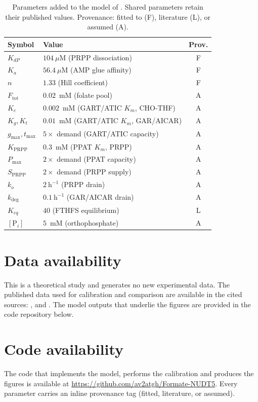 \documentclass[a4paper,fleqn]{cas-sc}
\begin{document}
\begin{table}[t]
\centering
\caption{Parameters added to the model of \citet{oizel2020}. Shared parameters
retain their published values. Provenance: fitted to \citet{witus2026} (F),
literature (L), or assumed (A).}
\label{tab:par}
\begin{tabular}{llc}
\toprule
Symbol & Value & Prov. \\
\midrule
$K_{dP}$ & $104~\mu$M (PRPP dissociation) & F \\
$K_a$ & $56.4~\mu$M (AMP glue affinity) & F \\
$n$ & $1.33$ (Hill coefficient) & F \\
$F_{\mathrm{tot}}$ & $0.02$~mM (folate pool) & A \\
$K_c$ & $0.002$~mM (GART/ATIC $K_m$, CHO-THF) & A \\
$K_g,K_t$ & $0.01$~mM (GART/ATIC $K_m$, GAR/AICAR) & A \\
$g_{\max},t_{\max}$ & $5\times$ demand (GART/ATIC capacity) & A \\
$K_{\mathrm{PRPP}}$ & $0.3$~mM (PPAT $K_m$, PRPP) & A \\
$P_{\max}$ & $2\times$ demand (PPAT capacity) & A \\
$S_{\mathrm{PRPP}}$ & $2\times$ demand (PRPP supply) & A \\
$k_o$ & $2~\mathrm{h}^{-1}$ (PRPP drain) & A \\
$k_{\mathrm{deg}}$ & $0.1~\mathrm{h}^{-1}$ (GAR/AICAR drain) & A \\
$K_{eq}$ & $40$ (FTHFS equilibrium) & L \\
$[\mathrm{P}_i]$ & $5$~mM (orthophosphate) & A \\
\bottomrule
\end{tabular}
\end{table}

\section*{Data availability}
This is a theoretical study and generates no new experimental data. The published
data used for calibration and comparison are available in the cited sources:
\citet{witus2026}, \citet{strefeler2025} and \citet{oizel2020}. The model outputs
that underlie the figures are provided in the code repository below.

\section*{Code availability}
The code that implements the model, performs the calibration and produces the
figures is available at \url{https://github.com/av2atgh/Formate-NUDT5}. Every parameter
carries an inline provenance tag (fitted, literature, or assumed).
\end{document}

